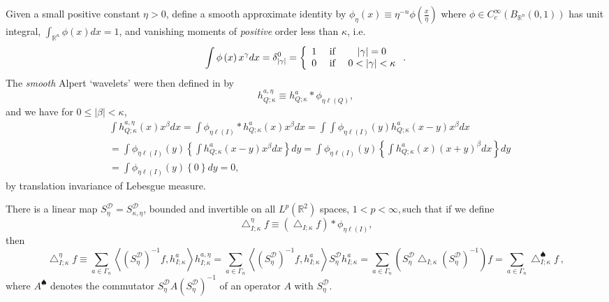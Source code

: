 \documentclass{amsart}%
\theoremstyle{plain}
\numberwithin{equation}{section}
\begin{document}
Given a small positive constant $\eta>0$, define a smooth approximate identity
by $\phi_{\eta}\left(  x\right)  \equiv\eta^{-n}\phi\left(  \frac{x}{\eta
}\right)  $ where $\phi\in C_{c}^{\infty}\left(  B_{\mathbb{R}^{n}}\left(
0,1\right)  \right)  $ has unit integral, $\int_{\mathbb{R}^{n}}\phi\left(
x\right)  dx=1$, and vanishing moments of \emph{positive} order less than
$\kappa$, i.e.
\begin{equation}
\int\phi\left(  x\right)  x^{\gamma}dx=\delta_{\left\vert \gamma\right\vert
}^{0}=\left\{
\begin{array}
[c]{ccc}%
1 & \text{ if } & \left\vert \gamma\right\vert =0\\
0 & \text{ if } & 0<\left\vert \gamma\right\vert <\kappa
\end{array}
\right.  .\label{van pos}%
\end{equation}
The \emph{smooth} Alpert `wavelets' were then defined in \cite{Saw7} by%
\[
h_{Q;\kappa}^{a,\eta}\equiv h_{Q;\kappa}^{a}\ast\phi_{\eta\ell\left(
Q\right)  },
\]
and we have for $0\leq\left\vert \beta\right\vert <\kappa$,%
\begin{align*}
&  \int h_{Q;\kappa}^{a,\eta}\left(  x\right)  x^{\beta}dx=\int\phi_{\eta
\ell\left(  I\right)  }\ast h_{Q;\kappa}^{a}\left(  x\right)  x^{\beta}%
dx=\int\int\phi_{\eta\ell\left(  I\right)  }\left(  y\right)  h_{Q;\kappa}%
^{a}\left(  x-y\right)  x^{\beta}dx\\
&  =\int\phi_{\eta\ell\left(  I\right)  }\left(  y\right)  \left\{  \int
h_{Q;\kappa}^{a}\left(  x-y\right)  x^{\beta}dx\right\}  dy=\int\phi_{\eta
\ell\left(  I\right)  }\left(  y\right)  \left\{  \int h_{Q;\kappa}^{a}\left(
x\right)  \left(  x+y\right)  ^{\beta}dx\right\}  dy\\
&  =\int\phi_{\eta\ell\left(  I\right)  }\left(  y\right)  \left\{  0\right\}
dy=0,
\end{align*}
by translation invariance of Lebesgue measure.

There is a linear map $S_{\eta}^{\mathcal{D}}=S_{\kappa,\eta}^{\mathcal{D}}$,
bounded and invertible on all $L^{p}\left(  \mathbb{R}^{2}\right)  $ spaces,
$1<p<\infty$,$\,$such that if we define%
\[
\bigtriangleup_{I;\kappa}^{\eta}f\equiv\left(  \bigtriangleup_{I;\kappa
}f\right)  \ast\phi_{\eta\ell\left(  I\right)  },
\]
then%
\[
\bigtriangleup_{I;\kappa}^{\eta}f\equiv\sum_{a\in\Gamma_{n}}\left\langle
\left(  S_{\eta}^{\mathcal{D}}\right)  ^{-1}f,h_{I;\kappa}^{a}\right\rangle
h_{I;\kappa}^{a,\eta}=\sum_{a\in\Gamma_{n}}\left\langle \left(  S_{\eta
}^{\mathcal{D}}\right)  ^{-1}f,h_{I;\kappa}^{a}\right\rangle S_{\eta
}^{\mathcal{D}}h_{I;\kappa}^{a}=\sum_{a\in\Gamma_{n}}\left(  S_{\eta
}^{\mathcal{D}}\bigtriangleup_{I;\kappa}\left(  S_{\eta}^{\mathcal{D}}\right)
^{-1}\right)  f=\sum_{a\in\Gamma_{n}}\bigtriangleup_{I;\kappa}^{\spadesuit
}f\ ,
\]
where $A^{\spadesuit}$ denotes the commutator $S_{\eta}^{\mathcal{D}}A\left(
S_{\eta}^{\mathcal{D}}\right)  ^{-1}$ of an operator $A$ with $S_{\eta
}^{\mathcal{D}}$.
\end{document}
